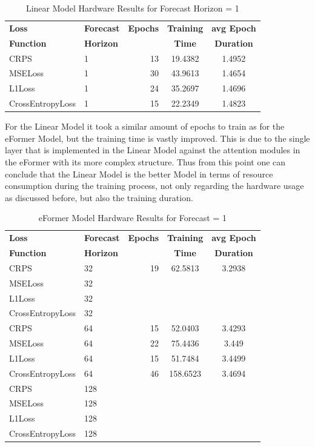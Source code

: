\documentclass{article}
\begin{document}
\begin{table}
    \centering
    \begin{tabular}{l|l|r|S|S}
        \toprule
        \textbf{Loss} & \textbf{Forecast} & \textbf{Epochs} & \textbf{Training} & \textbf{avg Epoch} \\
        \textbf{Function} & \textbf{Horizon} &  & \textbf{Time} & \textbf{Duration} \\
        \midrule
            CRPS & 1 & 13 & 19.4382 & 1.4952 \\
        MSELoss & 1 & 30 & 43.9613 & 1.4654 \\
        L1Loss & 1 & 24 & 35.2697 & 1.4696 \\
        CrossEntropyLoss & 1 & 15 & 22.2349 & 1.4823 \\
    \bottomrule
    \end{tabular}
    \caption{Linear Model Hardware Results for Forecast Horizon = 1}
    \label{tab:linear_training_f1}
\end{table}

For the Linear Model it took a similar amount of epochs to train as for the eFormer Model, but the training time is vastly improved. This is due to the single layer that is implemented in the Linear Model against the attention modules in the eFormer with its more complex structure. Thus from this point one can conclude that the Linear Model is the better Model in terms of resource consumption during the training process, not only regarding the hardware usage as discussed before, but also the training duration. 

\begin{table}
    \centering
    \begin{tabular}{l|l|r|S|S}
        \toprule
        \textbf{Loss} & \textbf{Forecast} & \textbf{Epochs} & \textbf{Training} & \textbf{avg Epoch} \\
        \textbf{Function} & \textbf{Horizon} &  & \textbf{Time} & \textbf{Duration} \\
        \midrule
            CRPS & 32 & 19 & 62.5813 & 3.2938 \\
        MSELoss & 32 &  &  &  \\
        L1Loss & 32 &  &  &  \\
        CrossEntropyLoss & 32 &  &  &  \\
        \midrule
        CRPS & 64 & 15 & 52.0403 & 3.4293 \\
        MSELoss & 64 & 22 & 75.4436 & 3.449 \\
        L1Loss & 64 & 15 & 51.7484 & 3.4499 \\
        CrossEntropyLoss & 64 & 46 & 158.6523 & 3.4694 \\
        \midrule
        CRPS & 128 &  &  &  \\
        MSELoss & 128 &  &  &  \\
        L1Loss & 128 &  &  &  \\
        CrossEntropyLoss & 128 &  &  &  \\
    \bottomrule
    \end{tabular}
    \caption{eFormer Model Hardware Results for Forecast = 1}
    \label{tab:eformer_training_f1}
\end{table}
\end{document}

